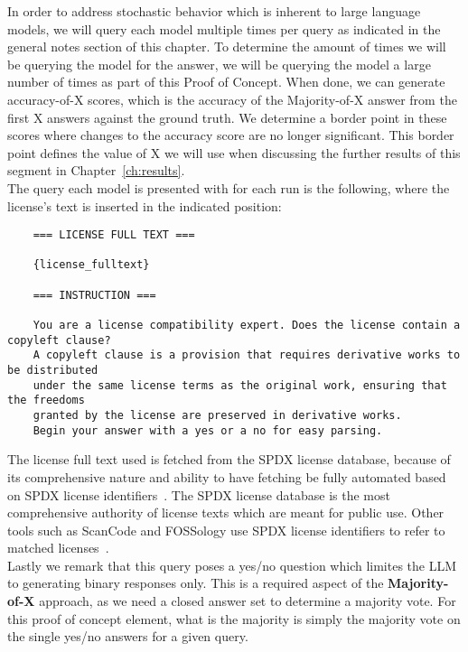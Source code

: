In order to address stochastic behavior which is inherent to large language models, we will query each model multiple times per query as indicated in the general notes section of this chapter. To determine the amount of times we will be querying the model for the answer, we will be querying the model a large number of times as part of this Proof of Concept. When done, we can generate accuracy-of-X scores, which is the accuracy of the Majority-of-X answer from the first X answers against the ground truth. We determine a border point in these scores where changes to the accuracy score are no longer significant.  This border point defines the value of X we will use when discussing the further results of this segment in Chapter~\ref{ch:results}. \\

The query each model is presented with for each run is the following, where the license's text is inserted in the indicated position:

\begin{verbatim}
	=== LICENSE FULL TEXT ===
	
	{license_fulltext}
	
	=== INSTRUCTION ===
	
	You are a license compatibility expert. Does the license contain a copyleft clause?
	A copyleft clause is a provision that requires derivative works to be distributed
	under the same license terms as the original work, ensuring that the freedoms
	granted by the license are preserved in derivative works.
	Begin your answer with a yes or a no for easy parsing.
\end{verbatim}

The license full text used is fetched from the SPDX license database, because of its comprehensive nature and ability to have fetching be fully automated based on SPDX license identifiers~\cite{spdx-licenses}. The SPDX license database is the most comprehensive authority of license texts which are meant for public use. Other tools such as ScanCode and FOSSology use SPDX license identifiers to refer to matched licenses~\cite{scancode-home}\cite{fossology-home}. \\

Lastly we remark that this query poses a yes/no question which limites the LLM to generating binary responses only. This is a required aspect of the \textbf{Majority-of-X} approach, as we need a closed answer set to determine a majority vote. For this proof of concept element, what is the majority is simply the majority vote on the single yes/no answers for a given query.


